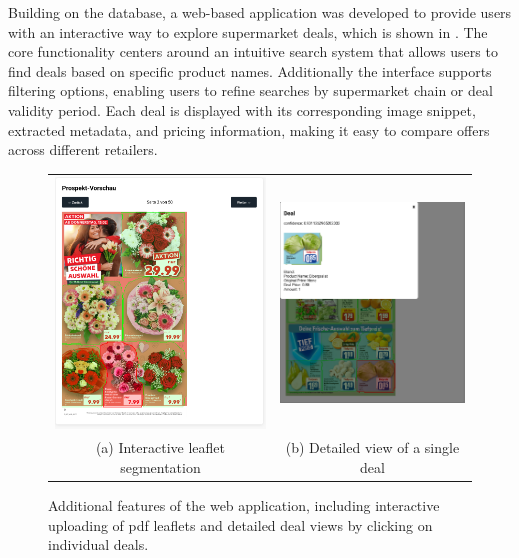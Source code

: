 \documentclass[11pt]{article}
\begin{document}
Building on the database, a web-based application was developed to provide users with an interactive way to explore supermarket deals, which is shown in . The core functionality centers around an intuitive search system that allows users to find deals based on specific product names. Additionally the interface supports filtering options, enabling users to refine searches by supermarket chain or deal validity period. Each deal is displayed with its corresponding image snippet, extracted metadata, and pricing information, making it easy to compare offers across different retailers.

\begin{figure}[h!]
    \centering
    \begin{tabular}{cc}
    \includegraphics[width=0.45\linewidth]{figures/application/leaflet_segmentations.png} &   \includegraphics[width=0.45\linewidth]{figures/application/single_deal.png} \\
    (a) Interactive leaflet segmentation & (b) Detailed view of a single deal \\[2pt]
    \end{tabular}
    \caption{Additional features of the web application, including interactive uploading of pdf leaflets and detailed deal views by clicking on individual deals.}
    \label{fig:application_combined}
\end{figure}
\end{document}
